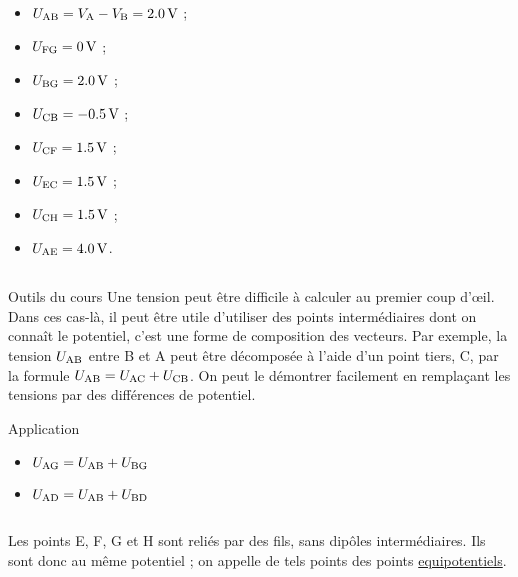 \documentclass[10pt,a5paper,notitlepage]{book}
\begin{document}
\begin{minipage}{0.5\linewidth}
    \begin{itemize}
        \item $U_{\rm AB} = V_{\rm A} - V_{\rm B} = \SI{2.0}{V}$ ;
        \item $U_{\rm FG} = \SI{0}{V}$ ;
        \item $U_{\rm BG} = \SI{2.0}{V}$ ;
        \item $U_{\rm CB} = \SI{-0.5}{V}$ ;
    \end{itemize}
\end{minipage}
\begin{minipage}{0.5\linewidth}
    \begin{itemize}
        \item $U_{\rm CF} = \SI{1.5}{V}$ ;
        \item $U_{\rm EC} = \SI{1.5}{V}$ ;
        \item $U_{\rm CH} = \SI{1.5}{V}$ ;
        \item $U_{\rm AE} = \SI{4.0}{V}$.
    \end{itemize}
\end{minipage}

\subsection{}
\begin{NCdemo}{Outils du cours}
    Une tension peut être difficile à calculer au premier coup d'œil. Dans
    ces cas-là, il peut être utile d'utiliser des points intermédiaires dont on
    connaît le potentiel, c'est une forme de composition des vecteurs. Par
    exemple, la tension $U_{\rm AB}$ entre B et A peut être décomposée à l'aide
    d'un point tiers, C, par la formule $U_{\rm AB} = U_{\rm AC} + U_{\rm CB}$.
    On peut le démontrer facilement en remplaçant les tensions par des
    différences de potentiel.
\end{NCdemo}

\begin{NCexem}{Application}
    \begin{itemize}
        \item $U_{\rm AG} = U_{\rm AB} + U_{\rm BG}$
        \item $U_{\rm AD} = U_{\rm AB} + U_{\rm BD}$
    \end{itemize}
\end{NCexem}

\subsection{}
Les points E, F, G et H sont reliés par des fils, sans dipôles intermédiaires.
Ils sont donc au même potentiel ; on appelle de tels points des points
\underline{equipotentiels}.
\end{document}
